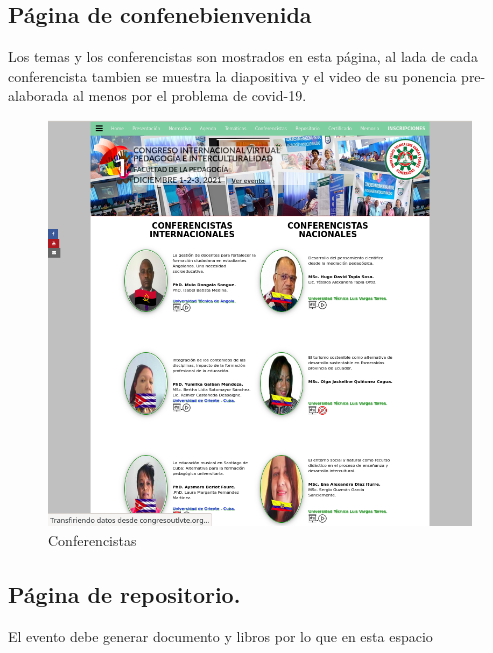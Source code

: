 \documentclass[a4paper,14px]{article}
\begin{document}
\newpage
\subsection{Página de confenebienvenida }
\label{sec:pagina-principal}

Los temas y los conferencistas son mostrados en esta página, al lada de cada conferencista tambien se muestra la diapositiva y el video de su ponencia pre-alaborada al menos por el problema de covid-19.



\begin{figure}[H]
  \centering
  \includegraphics[scale=0.6]{conferencistas.png}
  \caption{Conferencistas}
  \label{fig:arquitectura}
\end{figure}


\newpage
\subsection{Página de repositorio. }
\label{sec:pagina-principal}

El evento debe generar documento y libros por lo que en esta espacio
\end{document}
